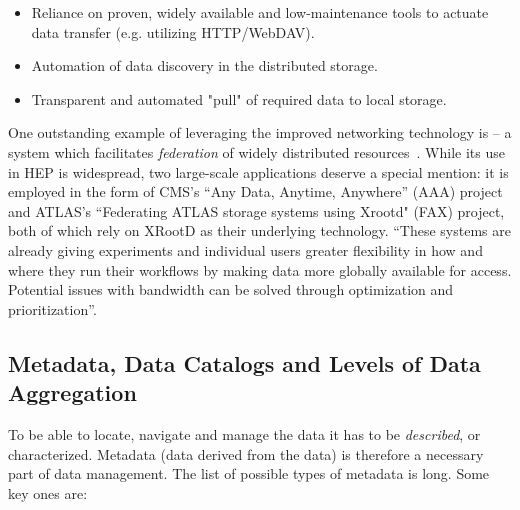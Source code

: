 \begin{itemize}
	\item Reliance on proven, widely available and low-maintenance tools to actuate data transfer (e.g. utilizing HTTP/WebDAV).
	\item Automation of data discovery in the distributed storage.
	\item Transparent and automated "pull" of required data to local storage.
\end{itemize}

One outstanding example of leveraging the improved networking technology is \xrootd -- a system which facilitates \textit{federation} of widely 
distributed resources~\cite{xrootd_fed,xrootd_snowmass}. While its use in HEP is widespread, two large-scale applications deserve a special mention: 
it is employed  in the form of CMS's ``Any Data, Anytime, Anywhere'' (AAA)
project and ATLAS's ``Federating ATLAS storage systems using Xrootd" (FAX) project, both of which rely
on XRootD as their underlying technology. ``These systems are already giving experiments and
individual users greater flexibility in how and where they run their workflows by making data more globally
available for access. Potential issues with bandwidth can be solved through optimization and prioritization''\cite{xrootd_snowmass}.


\subsection{Metadata, Data Catalogs and Levels of Data Aggregation}
To be able to locate, navigate and manage the data it has to be \textit{described}, or characterized. Metadata (data derived from the data) is
therefore a necessary part of data management. The  list of possible types of metadata is long. Some key ones are:

